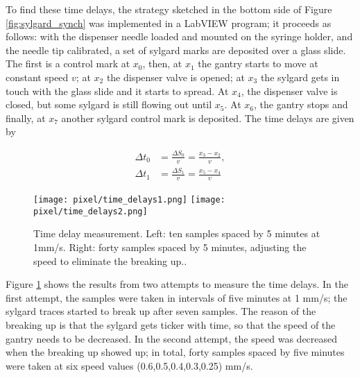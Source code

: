 To find these time delays, the strategy sketched in the bottom side of Figure \ref{fig:sylgard_synch} was implemented in a LabVIEW program; it proceeds as follows: with the dispenser needle loaded and mounted on the syringe holder, and the needle tip calibrated, a set of sylgard marks are deposited over a glass slide. The first is a control mark at $x_0$, then, at $x_1$ the gantry starts to move at constant speed $v$; at $x_2$ the dispenser valve is opened; at $x_3$ the sylgard gets in touch with the glass slide and it starts to spread. At $x_4$, the dispenser valve is closed, but some sylgard is still flowing out until $x_5$. At $x_6$, the gantry stops and finally, at $x_7$ another sylgard control mark is deposited. The time delays are given by 

\begin{align}
  \Delta t_0&=\frac{\Delta S_0}{v}=\frac{x_3-x_2}{v},\\
  \Delta t_1&=\frac{\Delta S_1}{v}=\frac{x_5-x_4}{v}
\end{align}


\begin{figure}[h]
  \begin{center}
    \texttt{[image: pixel/time\_delays1.png]} 
    \texttt{[image: pixel/time\_delays2.png]}
    \caption[Time delay measurements.]{Time delay measurement. Left: ten samples spaced by 5 minutes at 1mm/s. Right: forty samples spaced by 5 minutes, adjusting the speed to eliminate the breaking up..}\label{fig:delays_measure}
  \end{center}
\end{figure}

Figure \ref{fig:delays_measure} shows the results from two attempts to measure the time delays. In the first attempt, the samples were taken in intervals of five minutes at 1 mm/s; the sylgard traces started to break up after seven samples. The reason of the breaking up is that the sylgard gets ticker with time, so that the speed of the gantry needs to be decreased. In the second attempt, the speed was decreased when the breaking up showed up; in total, forty samples spaced by five minutes were taken at six speed values (0.6,0.5,0.4,0.3,0.25) mm/s.             
 

















